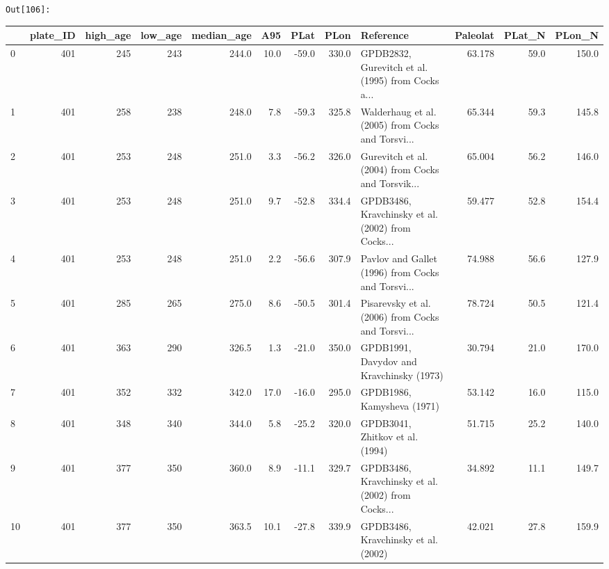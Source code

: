 \documentclass[11pt]{article}
\begin{document}
\texttt{\color{outcolor}Out[{\color{outcolor}106}]:}
    \begin{sidewaystable}
    {\tiny\begin{tabular}{lrrrrrrrlrrr}
\toprule
{} &  plate\_ID &  high\_age &  low\_age &  median\_age &   A95 &  PLat &   PLon &                                          Reference &  Paleolat &  PLat\_N &  PLon\_N \\
\midrule
0  &       401 &       245 &      243 &       244.0 &  10.0 & -59.0 &  330.0 &  GPDB2832, Gurevitch et al. (1995) from Cocks a... &    63.178 &    59.0 &   150.0 \\
1  &       401 &       258 &      238 &       248.0 &   7.8 & -59.3 &  325.8 &  Walderhaug et al. (2005) from Cocks and Torsvi... &    65.344 &    59.3 &   145.8 \\
2  &       401 &       253 &      248 &       251.0 &   3.3 & -56.2 &  326.0 &  Gurevitch et al. (2004) from Cocks and Torsvik... &    65.004 &    56.2 &   146.0 \\
3  &       401 &       253 &      248 &       251.0 &   9.7 & -52.8 &  334.4 &  GPDB3486, Kravchinsky et al. (2002) from Cocks... &    59.477 &    52.8 &   154.4 \\
4  &       401 &       253 &      248 &       251.0 &   2.2 & -56.6 &  307.9 &  Pavlov and Gallet (1996) from Cocks and Torsvi... &    74.988 &    56.6 &   127.9 \\
5  &       401 &       285 &      265 &       275.0 &   8.6 & -50.5 &  301.4 &  Pisarevsky et al. (2006) from Cocks and Torsvi... &    78.724 &    50.5 &   121.4 \\
6  &       401 &       363 &      290 &       326.5 &   1.3 & -21.0 &  350.0 &           GPDB1991, Davydov and Kravchinsky (1973) &    30.794 &    21.0 &   170.0 \\
7  &       401 &       352 &      332 &       342.0 &  17.0 & -16.0 &  295.0 &                         GPDB1986, Kamysheva (1971) &    53.142 &    16.0 &   115.0 \\
8  &       401 &       348 &      340 &       344.0 &   5.8 & -25.2 &  320.0 &                    GPDB3041, Zhitkov et al. (1994) &    51.715 &    25.2 &   140.0 \\
9  &       401 &       377 &      350 &       360.0 &   8.9 & -11.1 &  329.7 &  GPDB3486, Kravchinsky et al. (2002) from Cocks... &    34.892 &    11.1 &   149.7 \\
10 &       401 &       377 &      350 &       363.5 &  10.1 & -27.8 &  339.9 &                GPDB3486, Kravchinsky et al. (2002) &    42.021 &    27.8 &   159.9 \\

\end{tabular}}
\end{sidewaystable}
\end{document}
